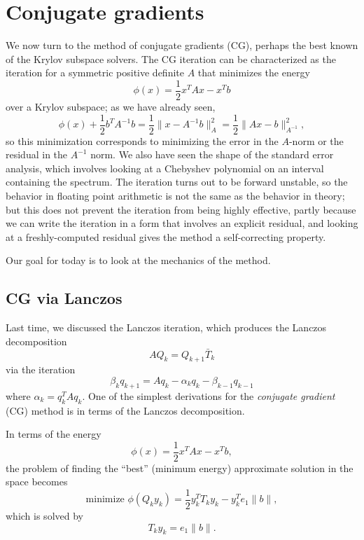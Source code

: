 \documentclass[12pt, leqno]{article} %
\begin{document}

\section{Conjugate gradients}

We now turn to the method of conjugate gradients (CG), perhaps the
best known of the Krylov subspace solvers.  The CG iteration can be
characterized as the iteration for a symmetric positive definite
$A$ that minimizes the energy
\[
  \phi(x) = \frac{1}{2} x^T A x - x^T b
\]
over a Krylov subspace; as we have already seen,
\[
  \phi(x) + \frac{1}{2} b^T A^{-1} b
  = \frac{1}{2} \|x-A^{-1} b\|_A^2
  = \frac{1}{2} \|Ax-b\|_{A^{-1}}^2,
\]
so this minimization corresponds to minimizing the error in the $A$-norm
or the residual in the $A^{-1}$ norm.  We also have seen the shape of
the standard error analysis, which involves looking at a Chebyshev
polynomial on an interval containing the spectrum.  The iteration turns
out to be forward unstable, so the behavior in floating point arithmetic
is not the same as the behavior in theory; but this does not prevent
the iteration from being highly effective, partly because we can
write the iteration in a form that involves an explicit residual,
and looking at a freshly-computed residual gives the method a
self-correcting property.

Our goal for today is to look at the mechanics of the method.

\subsection{CG via Lanczos}

Last time, we discussed the Lanczos iteration, which produces the
Lanczos decomposition
\[
  A Q_k = Q_{k+1} \bar{T}_k
\]
via the iteration
\[
  \beta_k q_{k+1} = A q_k - \alpha_k q_k - \beta_{k-1} q_{k-1}
\]
where $\alpha_k = q_k^T A q_k$.  One of the simplest derivations
for the {\em conjugate gradient} (CG) method is in terms of the
Lanczos decomposition.

In terms of the energy
\[
  \phi(x) = \frac{1}{2} x^T A x - x^T b,
\]
the problem of finding the ``best'' (minimum energy) approximate
solution in the space becomes
\[
  \mbox{minimize } \phi(Q_k y_k) = \frac{1}{2} y_k^T T_k y_k - y_k^T e_1 \|b\|,
\]
which is solved by
\[
  T_k y_k = e_1 \|b\|.
\]
\end{document}
